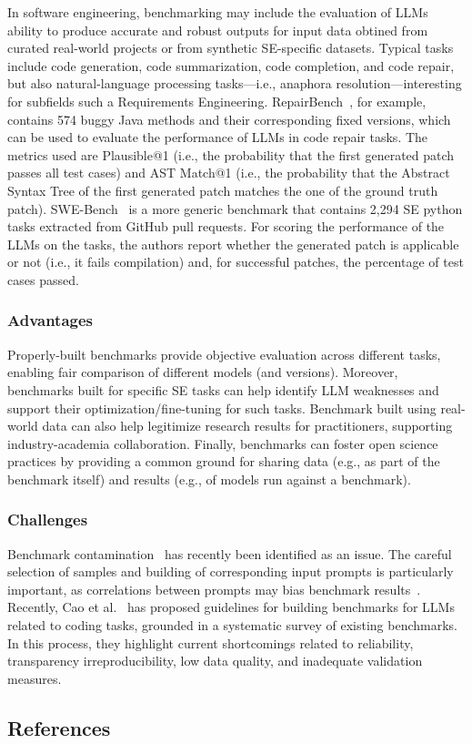 In software engineering, benchmarking may include the evaluation of LLMs ability to produce accurate and robust outputs for input data obtined from curated real-world projects or from synthetic SE-specific datasets. Typical tasks include code generation, code summarization, code completion, and code repair, but also natural-language processing tasks---i.e., anaphora resolution---interesting for subfields such a Requirements Engineering. 
RepairBench~\cite{silva2024repairbench}, for example, contains 574 buggy Java methods and their corresponding fixed versions, which can be used to evaluate the performance of LLMs in code repair tasks.
The metrics used are Plausible@1 (i.e., the probability that the first generated patch passes all test cases) and AST Match@1 (i.e., the probability that the Abstract Syntax Tree of the first generated patch matches the one of the ground truth patch).
SWE-Bench~\cite{DBLP:conf/iclr/JimenezYWYPPN24} is a more generic benchmark that contains 2,294 SE python tasks extracted from GitHub pull requests.
For scoring the performance of the LLMs on the tasks, the authors report whether the generated patch is applicable or not (i.e., it fails compilation) and, for successful patches, the percentage of test cases passed.

\subsubsection{Advantages}

Properly-built benchmarks provide objective evaluation across different tasks, enabling fair comparison of different models (and versions).
Moreover, benchmarks built for specific SE tasks can help identify LLM weaknesses and support their optimization/fine-tuning for such tasks.
Benchmark built using real-world data can also help legitimize research results for practitioners, supporting industry-academia collaboration.
Finally, benchmarks can foster open science practices by providing a common ground for sharing data (e.g., as part of the benchmark itself) and results (e.g., of models run against a benchmark).

\subsubsection{Challenges}

Benchmark contamination~\cite{DBLP:journals/corr/abs-2410-16186} has recently been identified as an issue.
The careful selection of samples and building of corresponding input prompts is particularly important, as correlations between prompts may bias benchmark results~\cite{DBLP:conf/acl/SiskaMAB24}.
Recently, Cao et al.~\cite{cao2025should} has proposed guidelines for building benchmarks for LLMs related to coding tasks, grounded in a systematic survey of existing benchmarks. 
In this process, they highlight current shortcomings related to reliability, transparency irreproducibility, low data quality, and inadequate validation measures.


\subsection{References}





